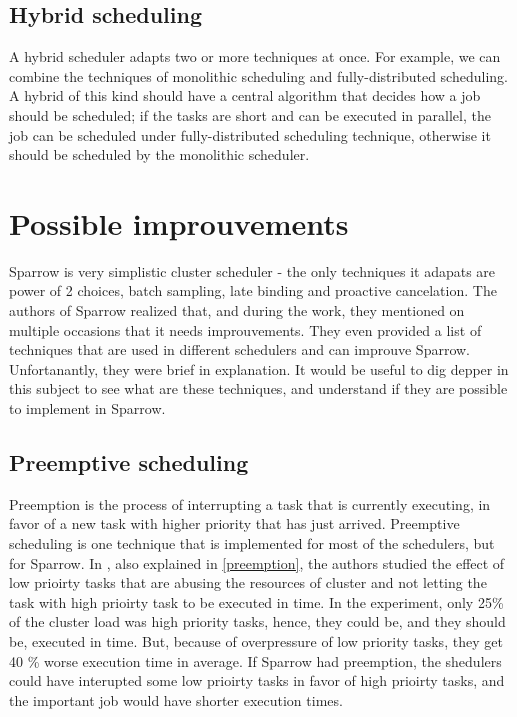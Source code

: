 \documentclass[11pt]{article}
\begin{document}
    \subsection{Hybrid scheduling}
    
    	A hybrid scheduler adapts two or more techniques at once. For example, we can combine the techniques of monolithic scheduling and fully-distributed scheduling. A hybrid of this kind should have a central algorithm that decides how a job should be scheduled; if the tasks are short and can be executed in parallel, the job can be scheduled under fully-distributed scheduling technique, otherwise it should be scheduled by the monolithic scheduler.


\section{Possible improuvements}

	Sparrow is very simplistic cluster scheduler - the only techniques it adapats are power of 2 choices, batch sampling, late binding and proactive cancelation. The authors of Sparrow realized that, and during the work, they mentioned on multiple occasions that it needs improuvements. They even provided a list of techniques \cite[section 8]{sparrow} that are used in different schedulers and can improuve Sparrow. Unfortanantly, they were brief in explanation. It would be useful to dig depper in this subject to see what are these techniques, and understand if they are possible to implement in Sparrow.
	
	\subsection{Preemptive scheduling}
	
		Preemption is the process of interrupting a task that is currently executing, in favor of a new task with higher priority that has just arrived. Preemptive scheduling is one technique that is implemented for most of the schedulers, but for Sparrow. In \cite[subsection 7.8]{sparrow}, also explained in \ref{preemption}, the authors studied the effect of low prioirty tasks that are abusing the resources of cluster and not letting the task with high prioirty task to be executed in time. In the experiment, only 25\% of the cluster load was high priority tasks, hence, they could be, and they should be, executed in time. But, because of overpressure of low priority tasks, they get 40 \% worse execution time in average. If Sparrow had preemption, the shedulers could have interupted some low prioirty tasks in favor of high prioirty tasks, and the important job would have shorter execution times.
		
\end{document}
